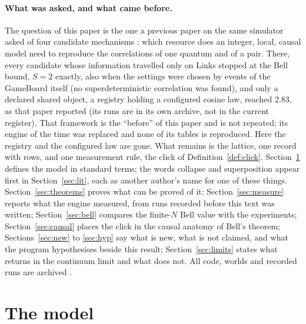 \documentclass[11pt]{article}
\theoremstyle{definition}
\begin{document}
\paragraph{What was asked, and what came before.} The question of this
paper is the one a previous paper on the same simulator asked of four
candidate mechanisms \cite{paper1}: which resource does an integer,
local, causal model need to reproduce the correlations of one quantum and
of a pair. There, every candidate whose information travelled only on
Links stopped at the Bell bound, $S = 2$ exactly, also when the settings
were chosen by events of the GameBoard itself (no superdeterministic
correlation was found), and only a declared shared object, a registry
holding a configured cosine law, reached $2.83$, as that paper reported
(its runs are in its own archive, not in the current register). That
framework is the ``before'' of this paper and is not repeated; its engine
of the time was replaced and none of its tables is reproduced. Here the
registry and the
configured law are gone. What remains is the lattice, one record with
rows, and one measurement rule, the click of Definition~\ref{def:click}.
Section~\ref{sec:model} defines the model in standard terms; the words
collapse and superposition appear first in Section~\ref{sec:lit},
each as another author's name for one of these things.
Section~\ref{sec:theorems} proves what can be proved of it;
Section~\ref{sec:measure} reports what the engine measured, from runs
recorded before this text was written; Section~\ref{sec:bell} compares
the finite-$N$ Bell value with the experiments; Section~\ref{sec:causal}
places the click in the causal anatomy of Bell's theorem;
Sections~\ref{sec:new} to \ref{sec:hyp} say what is new, what is not
claimed, and what the program hypothesises beside this result;
Section~\ref{sec:limits} states what returns in the continuum limit and
what does not. All code,
worlds and recorded runs are archived \cite{zenodo}.

\section{The model}\label{sec:model}
\end{document}
